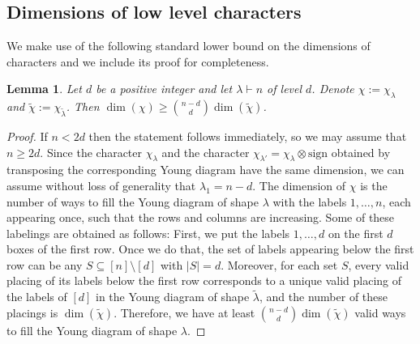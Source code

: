 \documentclass[11pt, letterpaper]{amsart}
\newtheorem{lem}[thm]{Lemma}
\renewcommand\ge{\geqslant}
\begin{document}
\subsection{Dimensions of low level characters}
We make use of the following standard lower bound on the dimensions of characters and we include its proof for completeness.
\begin{lem}\label{lem: dimension of characters}
Let $d$ be a positive integer and let $\lambda\vdash n$ of level $d$. Denote $\chi := \chi_\lambda$ and $\tilde{\chi} := \chi_{\tilde{\lambda}}$.
Then $\dim(\chi) \ge \binom{n-d}{d}\dim(\tilde{\chi})$.
\end{lem}
\begin{proof}
If $n < 2d$ then the statement follows immediately, so we may assume that $n \ge 2d$. Since the character $\chi_\lambda$ and the character $\chi_{\lambda'} = \chi_\lambda \otimes \text{sign}$ obtained by transposing the corresponding Young diagram have the same dimension, we can assume without loss of generality that $\lambda_1 = n-d$. The dimension of $\chi$ is the number of ways to fill the Young diagram of shape $\lambda$ with the labels $1,\dots,n$, each appearing once, such that the rows and columns are increasing. Some of these labelings are obtained as follows: First, we put the labels $1,\ldots, d$ on the first $d$ boxes of the first row. Once we do that, the set of labels appearing below the first row can be any $S \subseteq [n]\setminus[d]$ with $|S|=d$. Moreover, for each set $S$, every valid placing of its labels below the first row corresponds to a unique valid placing of the labels of $[d]$ in the Young diagram of shape $\tilde{\lambda}$, and the number of these placings is $\dim(\tilde{\chi})$. Therefore, we have at least $\binom{n-d}{d}\dim(\tilde{\chi})$ valid ways to fill the Young diagram of shape $\lambda$.
\end{proof}
\end{document}
